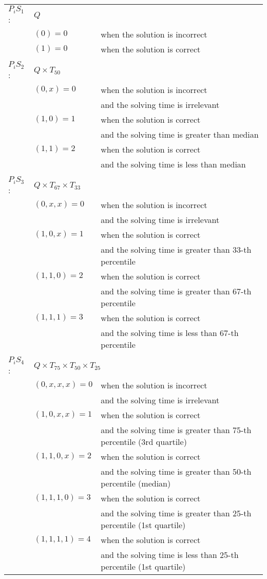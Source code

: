 \begin{center}\small
\begin{tabular}{lll}
$P_{i}S_{1}$:&\multicolumn{2}{l}{$Q$}   \\
& $(0) = 0$ &  when the solution is incorrect \\
& $(1) = 0$ &  when the solution is correct \\
& & \\
$P_{i}S_{2}$:&\multicolumn{2}{l}{$Q{\times}T_{50}$} \\
& $(0,x) = 0$ & when the solution is incorrect\\
&  & and the solving time is irrelevant\\
& $(1,0) = 1$ & when the solution is correct\\
& & and the solving time is greater than median\\
& $(1,1) = 2$ & when the solution is correct\\
& & and the solving time is less than median\\
& & \\
$P_{i}S_{3}$:&\multicolumn{2}{l}{$Q{\times}T_{67}{\times}T_{33}$} \\
& $(0,x,x) = 0$ & when the solution is incorrect\\
&  & and the solving time is irrelevant\\
& $(1,0,x) = 1$ & when the solution is correct\\
& & and the solving time is greater than 33-th percentile\\
& $(1,1,0) = 2$ & when the solution is correct\\
& & and the solving time is greater than 67-th percentile\\
& $(1,1,1) = 3$ & when the solution is correct\\
&  & and the solving time is less than 67-th percentile\\
& & \\
$P_{i}S_{4}$:&\multicolumn{2}{l}{$Q{\times}T_{75}{\times}T_{50}{\times}T_{25}$} \\
& $(0,x,x,x) = 0$ & when the solution is incorrect\\
&  & and the solving time is irrelevant\\
& $(1,0,x,x) = 1$ & when the solution is correct\\
& & and the solving time is greater than 75-th percentile (3rd quartile)\\
& $(1,1,0,x) = 2$ & when the solution is correct\\
& & and the solving time is greater than 50-th percentile (median)\\
& $(1,1,1,0) = 3$ & when the solution is correct\\
&  & and the solving time is greater than 25-th percentile (1st quartile)\\
& $(1,1,1,1) = 4$ & when the solution is correct\\
&  & and the solving time is less than 25-th percentile (1st quartile)\\
\end{tabular}
\end{center}

